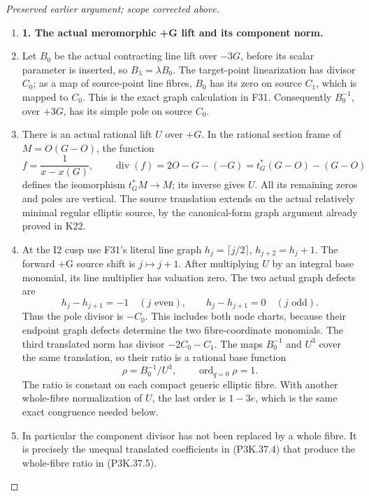 \begin{proof}[Preserved earlier argument; scope corrected above]
\begin{enumerate}[label=\arabic*.]
\item \par\medskip\noindent\textbf{1. The actual meromorphic +G lift and its component norm.}\enspace

\item Let \(B_0\) be the actual contracting line lift over \(-3G\), before
its scalar parameter is inserted, so \(B_\lambda=\lambda B_0\).
The target-point linearization has divisor \(C_0\); as a map of
source-point line fibres, \(B_0\) has its zero on source \(C_1\),
which is mapped to \(C_0\). This is the exact graph calculation in F31.
Consequently \(B_0^{-1}\), over \(+3G\), has its simple pole on
source \(C_0\).

\item There is an actual rational lift \(U\) over \(+G\). In the rational
section frame of \(M=O(G-O)\), the function
\[
 f=\frac1{x-x(G)},\qquad
 \operatorname{div}(f)=2O-G-(-G)
       =t_G^*(G-O)-(G-O)
\]
defines the isomorphism \(t_G^*M\to M\); its inverse gives \(U\).
All its remaining zeros and poles are vertical. The source translation
extends on the actual relatively minimal regular elliptic source, by the
canonical-form graph argument already proved in K22.

\item At the I2 cusp use F31's literal line graph
\(h_j=\lceil j/2\rceil\), \(h_{j+2}=h_j+1\).
The forward +G source shift is \(j\mapsto j+1\). After multiplying
\(U\) by an integral base monomial, its line multiplier has valuation
zero. The two actual graph defects are
\[
 h_j-h_{j+1}=-1\quad(j\text{ even}),\qquad
 h_j-h_{j+1}=0\quad(j\text{ odd}).                              \tag{P3K.37.4}
\]
Thus the pole divisor is \(-C_0\). This includes both node charts,
because their endpoint graph defects determine the two fibre-coordinate
monomials. The third translated norm has divisor \(-2C_0-C_1\).
The maps \(B_0^{-1}\) and \(U^3\) cover the same translation,
so their ratio is a rational base function
\[
 \rho=B_0^{-1}/U^3,\qquad \operatorname{ord}_{q=0}\rho=1.         \tag{P3K.37.5}
\]
The ratio is constant on each compact generic elliptic fibre. With another
whole-fibre normalization of \(U\), the last order is \(1-3e\),
which is the same exact congruence needed below.

\item In particular the component divisor has not been replaced by a whole fibre.
It is precisely the unequal translated coefficients in (P3K.37.4) that produce
the whole-fibre ratio in (P3K.37.5).


\end{enumerate}
\end{proof}
